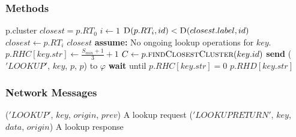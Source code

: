 \documentclass[]{article}
\begin{document}
				\subsubsection{Methods}
					\begin{algorithmic}
								\State \Return p.cluster
							\EndIf
							\State $closest = p.RT_0$
							\State $i \gets 1$
								\If $\Call{D}{p.RT_i, id} < \Call{D}{closest.label, id}$
									\State $closest \gets p.RT_i$
								\EndIf
							\EndFor	
							\State \Return $closest$
						\EndFunction
							\State \textbf{assume: }No ongoing lookup operations for $key$.
							\State  $p.RHC[key.str] \gets \frac{S_{min}+1}{3}+1$
							\State $C \gets p.\Call{findClosestCluster}{key.id}$
								\State \textbf{send} ($'LOOKUP'$, $key$, $p$, $p$) to  $\varphi$
							\EndFor
							\State \textbf{wait} until $p.RHC[key.str] = 0$
							\State \Return $p.RHD[key.str]$
						\EndFunction
					\end{algorithmic}
					
				\subsubsection{Network Messages}
					\begin{algorithmic}
						\State ($'LOOKUP'$, $key$, $origin$, $prev$) A lookup request
						\State ($'LOOKUPRETURN'$, $key$, $data$, $origin$) A lookup response
					\end{algorithmic}
					
\end{document}
